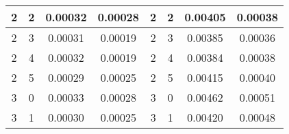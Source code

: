 \begin{table}[H]
\begin{tabular}{|c|c|c|c|c|c|c|c|}
2                                      & 2                                      & 0.00032                                                             & 0.00028                                                                 & 2                                      & 2                                     & 0.00405                                                             & 0.00038                                                                 \\ \hline
2                                      & 3                                      & 0.00031                                                             & 0.00019                                                                 & 2                                      & 3                                     & 0.00385                                                             & 0.00036                                                                 \\ \hline
2                                      & 4                                      & 0.00032                                                             & 0.00019                                                                 & 2                                      & 4                                     & 0.00384                                                             & 0.00038                                                                 \\ \hline
2                                      & 5                                      & 0.00029                                                             & 0.00025                                                                 & 2                                      & 5                                     & 0.00415                                                             & 0.00040                                                                 \\ \hline
3                                      & 0                                      & 0.00033                                                             & 0.00028                                                                 & 3                                      & 0                                     & 0.00462                                                             & 0.00051                                                                 \\ \hline
3                                      & 1                                      & 0.00030                                                             & 0.00025                                                                 & 3                                      & 1                                     & 0.00420                                                             & 0.00048                                                                 \\ \hline

\end{tabular}
\end{table}
